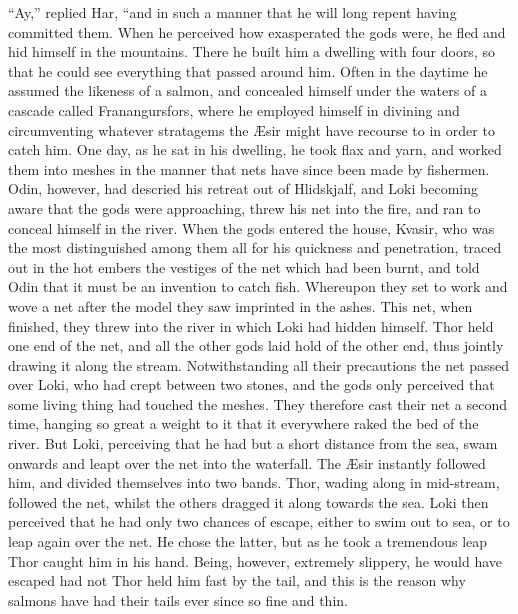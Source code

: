 ``Ay,'' replied Har, ``and in such a manner that he will long repent
having committed them. When he perceived how exasperated the gods
were, he fled and hid himself in the mountains. There he built him a
dwelling with four doors, so that he could see everything that passed
around him. Often in the daytime he assumed the likeness of a salmon,
and concealed himself under the waters of a cascade called
Franangursfors, where he employed himself in divining and
circumventing whatever stratagems the Æsir might have recourse to in
order to catch him. One day, as he sat in his dwelling, he took flax
and yarn, and worked them into meshes in the manner that nets have
since been made by fishermen. Odin, however, had descried his retreat
out of Hlidskjalf, and Loki becoming aware that the gods were
approaching, threw his net into the fire, and ran to conceal himself
in the river. When the gods entered the house, Kvasir, who was the
most distinguished among them all for his quickness and penetration,
traced out in the hot embers the vestiges of the net which had been
burnt, and told Odin that it must be an invention to catch fish.
Whereupon they set to work and wove a net after the model they saw
imprinted in the ashes. This net, when finished, they threw into the
river in which Loki had hidden himself. Thor held one end of the net,
and all the other gods laid hold of the other end, thus jointly
drawing it along the stream. Notwithstanding all their precautions the
net passed over Loki, who had crept between two stones, and the gods
only perceived that some living thing had touched the meshes. They
therefore cast their net a second time, hanging so great a weight to
it that it everywhere raked the bed of the river. But Loki, perceiving
that he had but a short distance from the sea, swam onwards and leapt
over the net into the waterfall. The Æsir instantly followed him, and
divided themselves into two bands. Thor, wading along in mid-stream,
followed the net, whilst the others dragged it along towards the sea.
Loki then perceived that he had only two chances of escape, either to
swim out to sea, or to leap again over the net. He chose the latter,
but as he took a tremendous leap Thor caught him in his hand. Being,
however, extremely slippery, he would have escaped had not Thor held
him fast by the tail, and this is the reason why salmons have had
their tails ever since so fine and thin.

